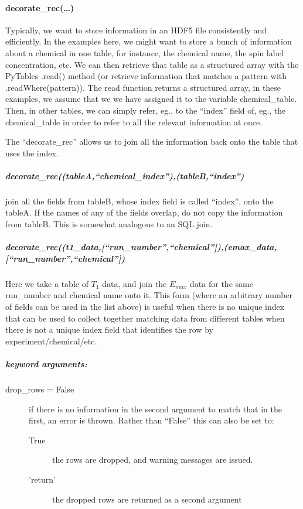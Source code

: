 \paragraph{decorate\_rec(\ldots)}
Typically, we want to store information in an HDF5 file consistently
    and efficiently.
In the examples here,
    we might want to store a bunch of information about a chemical
    in one table, for instance, the chemical name, the spin label
    concentration, etc.
We can then retrieve that table as a structured array
    with the PyTables .read() method
    (or retrieve information that matches a pattern with .readWhere(pattern)).
The read function returns a structured array,
    in these examples, we assume that we we have assigned it
    to the variable chemical\_table.
Then, in other tables,
    we can simply refer, eg., to the ``index'' field of, eg., the chemical\_table 
    in order to refer to all the relevant information at once.

The ``decorate\_rec'' allows us to join all the information back onto the table
    that uses the index.

\subparagraph{decorate\_rec((tableA,``chemical\_index''),(tableB,``index'')}
join all the fields from tableB, whose index field is called ``index'',
    onto the tableA.
If the names of any of the fields overlap, do not copy the information from
    tableB.
This is somewhat analogous to an SQL join.

\subparagraph{decorate\_rec((t1\_data,[``run\_number'',``chemical'']),(emax\_data,[``run\_number'',``chemical''])}
Here we take a table of $T_1$ data, and join the $E_{max}$ data for the same run\_number
    and chemical name onto it.
This form (where an arbitrary number of fields can be used in the list above)
    is useful when there is no unique index that can be used to
    collect together matching data from different tables
    when there is not a unique index field that identifies
    the row by experiment/chemical/etc.
\subparagraph{keyword arguments:}
\begin{description}
    \item[drop\_rows = False] if there is no information in the second argument to match that in the first, an error is thrown.  Rather than ``False'' this can also be set to:
        \begin{description}
            \item[True] the rows are dropped, and warning messages are issued.
            \item['return'] the dropped rows are returned as a second argument
        \end{description}
\end{description}

